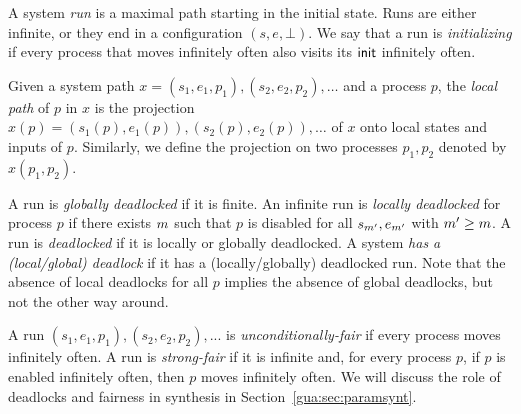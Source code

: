 A system \emph{run} is a maximal path starting in the initial state. Runs are either infinite, or they end in a configuration $(s,e,\bot)$. We say that a run is \emph{initializing} if every 
process
that moves infinitely often also visits 
its ${\sf init}$ 
infinitely often.

Given a system path $x = (s_1,e_1,p_1),(s_2,e_2,p_2),\ldots$ and a process $p$, the \emph{local path} of $p$ in $x$ is the projection $x(p) = (s_1(p),e_1(p)),(s_2(p),e_2(p)),\ldots$ of $x$ onto local states and inputs of $p$.
Similarly, we define the projection on two processes $p_1,p_2$ denoted by $x(p_1,p_2)$.


A run is \emph{globally deadlocked} if it is finite.
An infinite run is \emph{locally deadlocked} for process $p$ if there exists $m$ such that $p$ is disabled for all $s_{m'},e_{m'}$ with $m'\ge m$. A run is \emph{deadlocked} if it is locally or globally deadlocked.
A system \emph{has a (local/global) deadlock} if it has a (locally/globally) deadlocked run. Note that the absence of local deadlocks for all $p$ implies the absence of global deadlocks, but not the other way around.

A run $(s_1,e_1,p_1), (s_2,e_2,p_2),...$ is \emph{unconditionally-fair} if every process moves infinitely often. 
A run is \emph{strong-fair} if it is infinite and, for every process $p$, if $p$ is enabled infinitely often, then $p$ moves infinitely often.
We will discuss the role of deadlocks and fairness in synthesis in Section~\ref{gua:sec:paramsynt}.

